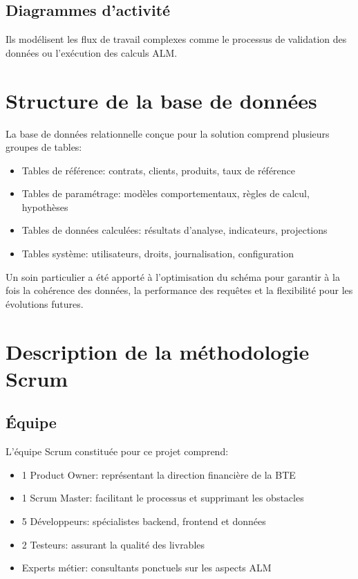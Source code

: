 \documentclass[12pt,a4paper]{report}
\begin{document}
\subsection{Diagrammes d'activité}
Ils modélisent les flux de travail complexes comme le processus de validation des données ou l'exécution des calculs ALM.

\section{Structure de la base de données}
La base de données relationnelle conçue pour la solution comprend plusieurs groupes de tables:
\begin{itemize}
    \item Tables de référence: contrats, clients, produits, taux de référence
    \item Tables de paramétrage: modèles comportementaux, règles de calcul, hypothèses
    \item Tables de données calculées: résultats d'analyse, indicateurs, projections
    \item Tables système: utilisateurs, droits, journalisation, configuration
\end{itemize}

Un soin particulier a été apporté à l'optimisation du schéma pour garantir à la fois la cohérence des données, la performance des requêtes et la flexibilité pour les évolutions futures.

\section{Description de la méthodologie Scrum}

\subsection{Équipe}
L'équipe Scrum constituée pour ce projet comprend:
\begin{itemize}
    \item 1 Product Owner: représentant la direction financière de la BTE
    \item 1 Scrum Master: facilitant le processus et supprimant les obstacles
    \item 5 Développeurs: spécialistes backend, frontend et données
    \item 2 Testeurs: assurant la qualité des livrables
    \item Experts métier: consultants ponctuels sur les aspects ALM
\end{itemize}
\end{document}
